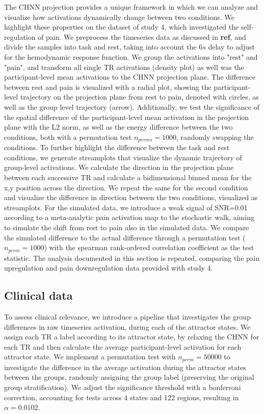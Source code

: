 \documentclass{article}
\begin{document}
The CHNN projection provides a unique framework in which we can analyze and visualize how activations dynamically
change between two conditions. We highlight these properties on the dataset of study 4, which investigated
the self-regulation of pain. We preprocess the timeseries data as discussed in \textbf{ref}, and divide the samples into
task and rest, taking into account the $6 s$ delay to adjust for the hemodynamic response function.
We group the activations into "rest" and "pain", and transform all single TR activations (density plot) as well was the
participant-level mean activations to the CHNN projection plane.
The difference between rest and pain is visualized with a radial plot, showing the participant-level trajectory on
the projection plane from rest to pain, denoted with circles, as well as the group level trajectory (arrow).
Additionally, we test the significance of the spatial difference of the participant-level mean activation in
the projection plane with the L2 norm,
as well as the energy difference between the two conditions, both with a permutation test $n_{perms}=1000$,
randomly swapping the conditions.
To further highlight the difference between the task and rest conditions, we generate streamplots that visualize the
dynamic trajectory of group-level activations.
We calculate the direction in the projection plane between each successive TR and calculate a bidimensional binned
mean for the x,y position across the direction.
We repeat the same for the second condition and visualize the difference in direction between the two conditions,
visualized as streamplots.
For the simulated data, we introduce a weak signal of SNR=0.01 according to a meta-analytic pain activation map
\citep{zunhammer2021meta} to the stochastic walk, aiming to simulate the shift from rest to pain also in the
simulated data. We compare the simulated difference to the actual difference through a permutation test
($n_{perm}=1000$) with the spearman rank-ordered correlation coefficient as the test statistic.
The analysis documented in this section is repeated, comparing the pain upregulation and pain downregulation
data provided with study 4.

\subsection{Clinical data}\label{Clinical data}

To assess clinical relevance, we introduce a pipeline that investigates the group differences in raw timeseries
activation, during each of the attractor states.
We assign each TR a label according to its attractor state, by relaxing the CHNN for each TR and then calculate the
average participant-level activation for each attractor state.
We implement a permutation test with $n_{perm}=50000$ to investigate the difference in the average activation during the
attractor states between the groups, randomly assigning the group label (preserving the original group stratification).
We adjust the significance threshold with a bonferroni correction, accounting for tests across 4 states and 122 regions,
resulting in $\alpha = 0.0102$.
\end{document}
